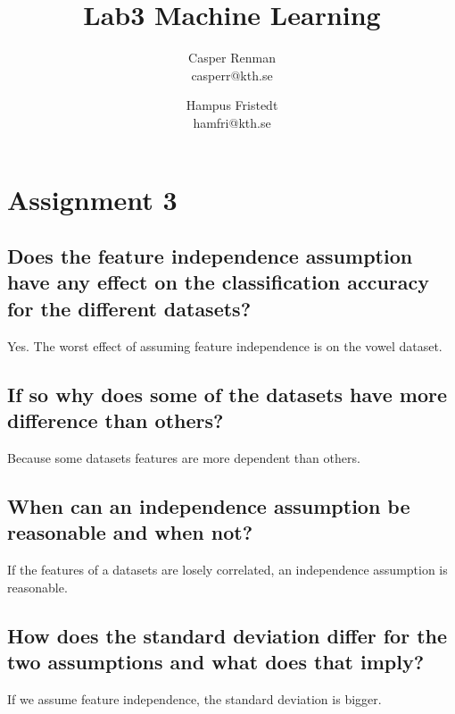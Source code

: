 \documentclass{article}
\title{Lab3 Machine Learning}
\author{Casper Renman\\casperr@kth.se \and Hampus Fristedt\\hamfri@kth.se}
\begin{document}
\maketitle

\section{Assignment 3} 

\subsection{Does the feature independence assumption have any effect on the
classification accuracy for the different datasets?} 
Yes. The worst effect of assuming feature independence is on the vowel dataset.

\subsection{If so why does some of the datasets have more difference than
others?}

Because some datasets features are more dependent than others.

\subsection{When can an independence assumption be reasonable and when not?}

If the features of a datasets are losely correlated, an independence assumption 
is reasonable.

\subsection{How does the standard deviation differ for the two assumptions and
what does that imply?}

If we assume feature independence, the standard deviation is bigger.

\end{document}
